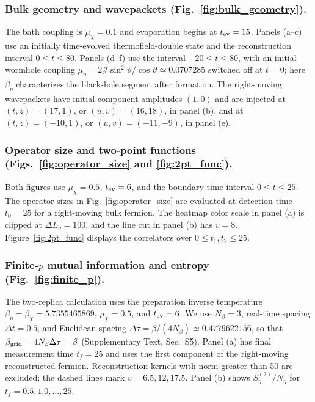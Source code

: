 \documentclass[pdflatex,sn-nature]{sn-jnl}
\begin{document}
\subsubsection{Bulk geometry and wavepackets (Fig.~\ref{fig:bulk_geometry}).}
The bath coupling is \(\mu_\chi=0.1\) and evaporation begins at \(t_{\rm ev}=15\). Panels (a--c) use an initially time-evolved thermofield-double state and the reconstruction interval \(0\leq t\leq80\). Panels (d--f) use the interval \(-20\leq t\leq80\), with an initial wormhole coupling \(\mu_\eta=2\mathcal J\sin^2\vartheta/\cos\vartheta\simeq0.0707285\) switched off at \(t=0\); here \(\beta_\eta\) characterizes the black-hole segment after formation. The right-moving wavepackets have initial component amplitudes \((1,0)\) and are injected at \((t,z)=(17,1)\), or \((u,v)=(16,18)\), in panel (b), and at \((t,z)=(-10,1)\), or \((u,v)=(-11,-9)\), in panel (e).

\subsubsection{Operator size and two-point functions (Figs.~\ref{fig:operator_size} and \ref{fig:2pt_func}).}
Both figures use \(\mu_\chi=0.5\), \(t_{\rm ev}=6\), and the boundary-time interval \(0\leq t\leq25\). The operator sizes in Fig.~\ref{fig:operator_size} are evaluated at detection time \(t_0=25\) for a right-moving bulk fermion. The heatmap color scale in panel (a) is clipped at \(\Delta L_\eta=100\), and the line cut in panel (b) has \(v=8\). Figure~\ref{fig:2pt_func} displays the correlators over \(0\leq t_1,t_2\leq25\).

\subsubsection{Finite-\texorpdfstring{\(p\)}{p} mutual information and entropy (Fig.~\ref{fig:finite_p}).}
The two-replica calculation uses the preparation inverse temperature \(\beta_\eta=\beta_\chi=5.7355465869\), \(\mu_\chi=0.5\), and \(t_{\rm ev}=6\). We use \(N_\beta=3\), real-time spacing \(\Delta t=0.5\), and Euclidean spacing \(\Delta\tau=\beta/(4N_\beta)\simeq0.4779622156\), so that \(\beta_{\rm grid}=4N_\beta\Delta\tau=\beta\) (Supplementary Text, Sec.~S5). Panel (a) has final measurement time \(t_f=25\) and uses the first component of the right-moving reconstructed fermion. Reconstruction kernels with norm greater than 50 are excluded; the dashed lines mark \(v=6.5,12,17.5\). Panel (b) shows \(S_\eta^{(2)}/N_\eta\) for \(t_f=0.5,1.0,\ldots,25\).
\end{document}
